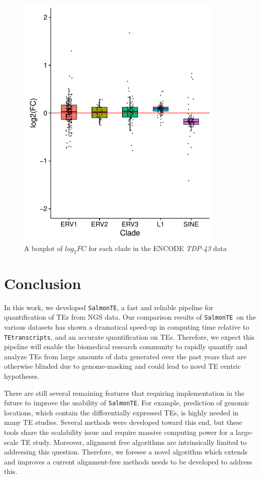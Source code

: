 \documentclass[wsdraft]{ws-procs11x85}
\newcommand{\TEtranscripts}{\texttt{TEtranscripts}}
\newcommand{\SalmonTE}{\texttt{SalmonTE}}
\begin{document}
\begin{figure}[h]
\centerline{
\includegraphics[width=10cm]{boxplot-clade-k562}
}
\caption{A boxplot of $log_{2}FC$ for each clade in the ENCODE \textit{TDP-43} data}
\label{aba:fig5}
\end{figure}

\section{Conclusion}


In this work, we developed \SalmonTE, a fast and reliable pipeline for quantification of TEs from 
NGS data.
Our comparison results of \SalmonTE~on the various datasets has shown a dramatical speed-up in computing time relative to \TEtranscripts, 
and
an accurate quantification on TEs. 
Therefore, we expect this pipeline will enable the biomedical research community to rapidly quantify and analyze TEs from large amounts of data generated over the past years that are otherwise blinded due to genome-masking and could lead to novel TE centric hypotheses.

There are still several remaining features that requiring implementation in the future to improve the usability of \SalmonTE. 
For example, prediction of genomic locations, which contain the differentially expressed TEs, is highly needed in many TE studies. Several methods were developed toward this end\cite{de2017identifying,criscione2014transcriptional}, but these tools share the scalability issue and require massive computing power for a large-scale TE study. 
Moreover, alignment free algorithms are intrinsically limited to addressing this question. 
Therefore, we foresee a novel algorithm which extends and improves a current alignment-free methods needs to be developed to address this.
\end{document}
